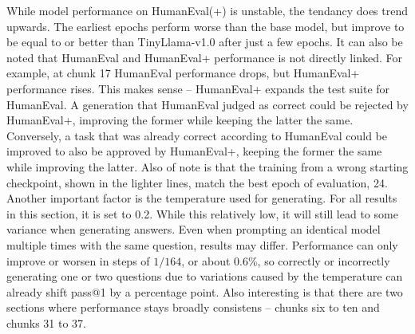 While model performance on HumanEval(+) is unstable, the tendancy does trend upwards. The earliest epochs perform worse than the base model, but improve to be equal to or better than TinyLlama-v1.0 after just a few epochs.
It can also be noted that HumanEval and HumanEval+ performance is not directly linked.
For example, at chunk 17 HumanEval performance drops, but HumanEval+ performance rises.
This makes sense -- HumanEval+ expands the test suite for HumanEval.
A generation that HumanEval judged as correct could be rejected by HumanEval+, improving the former while keeping the latter the same.
Conversely, a task that was already correct according to HumanEval could be improved to also be approved by HumanEval+, keeping the former the same while improving the latter.
Also of note is that the training from a wrong starting checkpoint, shown in the lighter lines, match the best epoch of evaluation, 24.
Another important factor is the temperature used for generating.
For all results in this section, it is set to 0.2.
While this relatively low, it will still lead to some variance when generating answers.
Even when prompting an identical model multiple times with the same question, results may differ.
Performance can only improve or worsen in steps of $1/164$, or about 0.6\%, so correctly or incorrectly generating one or two questions due to variations caused by the temperature can already shift pass@1 by a percentage point.
Also interesting is that there are two sections where performance stays broadly consistens -- chunks six to ten and chunks 31 to 37.


